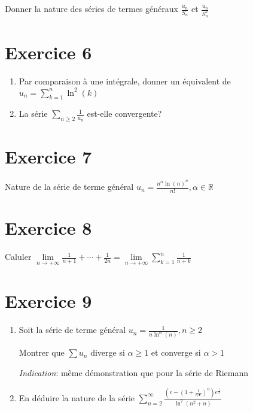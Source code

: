 \documentclass[11pt]{article}
\begin{document}
Donner la nature des séries de termes généraux $\frac{u_n}{S_n}$ et $\frac{u_n}{S_n^2}$

\section*{Exercice 6}

\begin{enumerate}
\item Par comparaison à une intégrale, donner un équivalent de $u_n=\sum_{k=1}^{n} \ln^2(k)$
\item La série $ \sum_{n\ge2} \frac{1}{u_n}$ est-elle convergente? 
\end{enumerate}

\section*{Exercice 7}

Nature de la série de terme général $u_n=\frac{n^{\alpha}\ln(n)^n}{n!} , \alpha\in \mathbb{R}$

\section*{Exercice 8}

Caluler $\lim\limits_{n \rightarrow +\infty} \frac{1}{n+1}+\cdots+\frac{1}{2n}=\lim\limits_{n \rightarrow +\infty} \sum_{k=1}^{n} \frac{1}{n+k}$

\section*{Exercice 9}

\begin{enumerate}
\item Soit la série de terme général $u_n=\frac{1}{n\ln^{\alpha}(n)}, n\ge2$

Montrer que $\sum u_n$ diverge si $\alpha\ge1$ et converge si $\alpha>1$

\emph{Indication}: même démonstration que pour la série de Riemann

\item En déduire la nature de la série $\sum_{n=2}^{\infty} \frac{(e - (1+\frac{1}{n•})^n)e^\frac{1}{n}}{\ln^2(n^2+n)}$


\end{enumerate}
\end{document}
